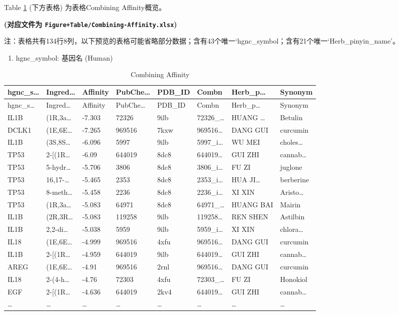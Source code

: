 \documentclass[
]{article}
\providecommand{\tightlist}{%
  \setlength{\itemsep}{0pt}\setlength{\parskip}{0pt}}
\begin{document}
Table \ref{tab:Combining-Affinity} (下方表格) 为表格Combining Affinity概览。

\textbf{(对应文件为 \texttt{Figure+Table/Combining-Affinity.xlsx})}

\begin{center}\begin{tcolorbox}[colback=gray!10, colframe=gray!50, width=0.9\linewidth, arc=1mm, boxrule=0.5pt]注：表格共有134行8列，以下预览的表格可能省略部分数据；含有43个唯一`hgnc\_symbol；含有21个唯一`Herb\_pinyin\_name'。
\end{tcolorbox}
\end{center}
\begin{center}\begin{tcolorbox}[colback=gray!10, colframe=gray!50, width=0.9\linewidth, arc=1mm, boxrule=0.5pt]\begin{enumerate}\tightlist
\item hgnc\_symbol:  基因名 (Human)
\end{enumerate}\end{tcolorbox}
\end{center}

\begin{longtable}[]{@{}llllllll@{}}
\caption{\label{tab:Combining-Affinity}Combining Affinity}\tabularnewline
\toprule
hgnc\_s\ldots{} & Ingred\ldots{} & Affinity & PubChe\ldots{} & PDB\_ID & Combn & Herb\_p\ldots{} & Synonym\tabularnewline
\midrule
\endfirsthead
\toprule
hgnc\_s\ldots{} & Ingred\ldots{} & Affinity & PubChe\ldots{} & PDB\_ID & Combn & Herb\_p\ldots{} & Synonym\tabularnewline
\midrule
\endhead
IL1B & (1R,3a\ldots{} & -7.303 & 72326 & 9ilb & 72326\_\ldots{} & HUANG \ldots{} & Betulin\tabularnewline
DCLK1 & (1E,6E\ldots{} & -7.265 & 969516 & 7kxw & 969516\ldots{} & DANG GUI & curcumin\tabularnewline
IL1B & (3S,8S\ldots{} & -6.096 & 5997 & 9ilb & 5997\_i\ldots{} & WU MEI & choles\ldots{}\tabularnewline
TP53 & 2-{[}(1R\ldots{} & -6.09 & 644019 & 8dc8 & 644019\ldots{} & GUI ZHI & cannab\ldots{}\tabularnewline
TP53 & 5-hydr\ldots{} & -5.706 & 3806 & 8dc8 & 3806\_i\ldots{} & FU ZI & juglone\tabularnewline
TP53 & 16,17-\ldots{} & -5.465 & 2353 & 8dc8 & 2353\_i\ldots{} & HUA JI\ldots{} & berberine\tabularnewline
TP53 & 8-meth\ldots{} & -5.458 & 2236 & 8dc8 & 2236\_i\ldots{} & XI XIN & Aristo\ldots{}\tabularnewline
TP53 & (1R,3a\ldots{} & -5.083 & 64971 & 8dc8 & 64971\_\ldots{} & HUANG BAI & Mairin\tabularnewline
IL1B & (2R,3R\ldots{} & -5.083 & 119258 & 9ilb & 119258\ldots{} & REN SHEN & Astilbin\tabularnewline
IL1B & 2,2-di\ldots{} & -5.038 & 5959 & 9ilb & 5959\_i\ldots{} & XI XIN & chlora\ldots{}\tabularnewline
IL18 & (1E,6E\ldots{} & -4.999 & 969516 & 4xfu & 969516\ldots{} & DANG GUI & curcumin\tabularnewline
IL1B & 2-{[}(1R\ldots{} & -4.959 & 644019 & 9ilb & 644019\ldots{} & GUI ZHI & cannab\ldots{}\tabularnewline
AREG & (1E,6E\ldots{} & -4.91 & 969516 & 2rnl & 969516\ldots{} & DANG GUI & curcumin\tabularnewline
IL18 & 2-(4-h\ldots{} & -4.76 & 72303 & 4xfu & 72303\_\ldots{} & FU ZI & Honokiol\tabularnewline
EGF & 2-{[}(1R\ldots{} & -4.636 & 644019 & 2kv4 & 644019\ldots{} & GUI ZHI & cannab\ldots{}\tabularnewline
\ldots{} & \ldots{} & \ldots{} & \ldots{} & \ldots{} & \ldots{} & \ldots{} & \ldots{}\tabularnewline
\bottomrule
\end{longtable}
\end{document}
